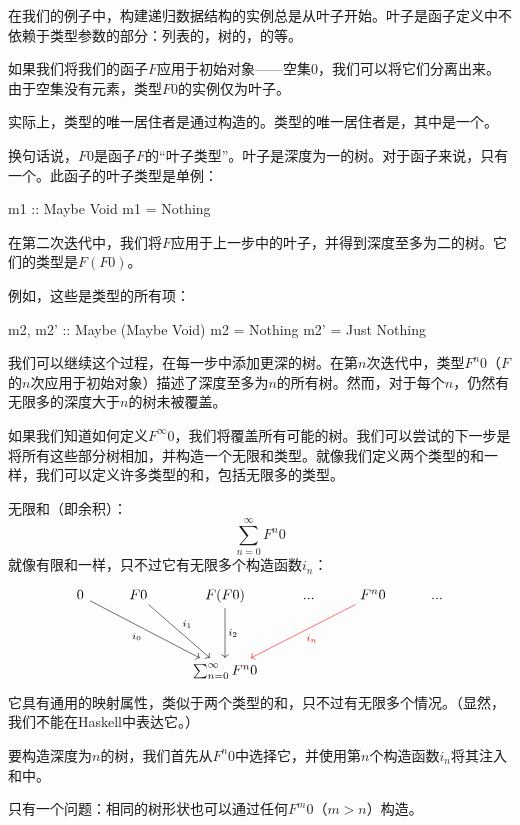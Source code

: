 \documentclass[DaoFP]{subfiles}
\begin{document}
 在我们的例子中，构建递归数据结构的实例总是从叶子开始。叶子是函子定义中不依赖于类型参数的部分：列表的，树的，的等。

 如果我们将我们的函子$F$应用于初始对象——空集$0$，我们可以将它们分离出来。由于空集没有元素，类型$F 0$的实例仅为叶子。

 实际上，类型的唯一居住者是通过构造的。类型的唯一居住者是，其中是一个。

 换句话说，$F 0$是函子$F$的“叶子类型”。叶子是深度为一的树。对于函子来说，只有一个。此函子的叶子类型是单例：
 \begin{haskell}
  m1 :: Maybe Void
  m1 = Nothing
 \end{haskell}

 在第二次迭代中，我们将$F$应用于上一步中的叶子，并得到深度至多为二的树。它们的类型是$F(F 0)$。

 例如，这些是类型的所有项：
 \begin{haskell}
  m2, m2' :: Maybe (Maybe Void)
  m2 = Nothing
  m2' = Just Nothing
 \end{haskell}

 我们可以继续这个过程，在每一步中添加更深的树。在第$n$次迭代中，类型$F^n 0$（$F$的$n$次应用于初始对象）描述了深度至多为$n$的所有树。然而，对于每个$n$，仍然有无限多的深度大于$n$的树未被覆盖。

 如果我们知道如何定义$F^{\infty} 0$，我们将覆盖所有可能的树。我们可以尝试的下一步是将所有这些部分树相加，并构造一个无限和类型。就像我们定义两个类型的和一样，我们可以定义许多类型的和，包括无限多的类型。

 无限和（即余积）：
 $$ \sum_{n = 0}^{\infty} F^n 0$$
 就像有限和一样，只不过它有无限多个构造函数$i_n$：
 \[
  \begin{tikzcd}
   0
   \arrow[ddrr, "i_0"']
   & F 0
   \arrow[ddr, "i_1"]
   & F (F 0)
   \arrow[dd, "i_2"]
   & ...
   & F^n 0
   \arrow[ddll, red, "i_n"]
   & ...
   \\
   \\
   &&\sum_{n = 0}^{\infty} F^n 0
  \end{tikzcd}
 \]
 它具有通用的映射属性，类似于两个类型的和，只不过有无限多个情况。（显然，我们不能在Haskell中表达它。）

 要构造深度为$n$的树，我们首先从$F^n 0$中选择它，并使用第$n$个构造函数$i_n$将其注入和中。

 只有一个问题：相同的树形状也可以通过任何$F^m 0$（$m > n$）构造。
\end{document}
